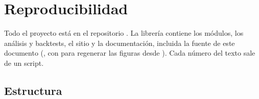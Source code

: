 \chapter{Reproducibilidad}
\label{ap:repro}

Todo el proyecto está en el repositorio . La librería  contiene los módulos,  los análisis y backtests,  el sitio y  la documentación, incluida la fuente de este documento (, con  para regenerar las figuras desde ). Cada número del texto sale de un script.

\section{Estructura}

